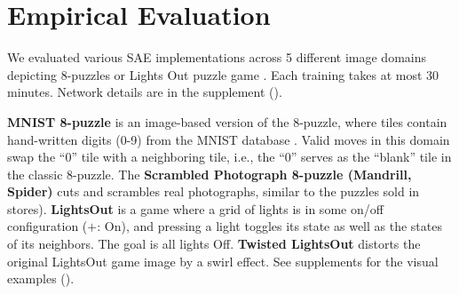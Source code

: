 \section{Empirical Evaluation}
\label{evaluation}

We evaluated various SAE implementations across 5 different
image domains depicting 8-puzzles or Lights Out puzzle game \cite{lightsout}.
Each training takes at most 30 minutes.
Network details are in the supplement ().

\textbf{MNIST 8-puzzle}
is an image-based version of the 8-puzzle, where tiles contain hand-written digits (0-9) from the  MNIST database \cite{lecun1998gradient}.
Valid moves in this domain swap the ``0'' tile  with a neighboring tile, i.e., the ``0'' serves as the ``blank'' tile in the classic 8-puzzle. 
The \textbf{Scrambled Photograph 8-puzzle (Mandrill, Spider)} cuts and scrambles real photographs, similar to the puzzles sold in stores).
\textbf{LightsOut} \cite{lightsout} is
a game where a grid of lights is in some on/off configuration ($+$: On),
and pressing a light toggles its state as well as the states of its neighbors.
The goal is all lights Off.
\textbf{Twisted LightsOut} distorts the original LightsOut game image by a swirl effect.
See supplements for the visual examples ().

